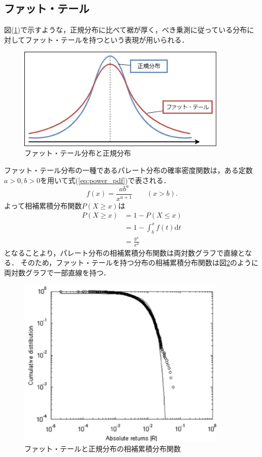 \documentclass[titlepage]{jsreport}
\begin{document}
\subsection{ファット・テール}
図(\ref{fig:fat_tail})で示すような，正規分布に比べて裾が厚く，べき乗測に従っている分布に対してファット・テールを持つという表現が用いられる\cite{fat-tailed}．
\begin{figure}[htbp]
    \centering
    \includegraphics[width=10cm]{fig/fat_tail.png}
    \caption{ファット・テール分布と正規分布}
    \label{fig:fat_tail}
\end{figure}
ファット・テール分布の一種であるパレート分布の確率密度関数は，ある定数$a > 0,b > 0$を用いて式(\ref{eq:power_pdf})で表される\cite{PowerDistribution}．
\begin{equation}
    f(x) = \frac{ab^a}{x^{a + 1}} \qquad (x > b). \label{eq:power_pdf}
\end{equation}
よって相補累積分布関数$P(X \geq x)$は
\begin{equation}
    \begin{aligned}
        P(X \geq x) & = 1 - P(X \leq x)                     \\
                    & = 1 - \int_{b}^{x} f(t) \mathrm{d}t   \\
                    & = \frac{b^a}{x^a} \label{eq:survival}
    \end{aligned}
\end{equation}
となることより，パレート分布の相補累積分布関数は両対数グラフで直線となる．
そのため，ファット・テールを持つ分布の相補累積分布関数は図\ref{fig:fat_tail_survival}のように両対数グラフで一部直線を持つ．

\begin{figure}[htbp]
    \centering
    \includegraphics[width=10cm]{fig/fat_tail_survival.pdf}
    \caption{ファット・テールと正規分布の相補累積分布関数\cite{Cont2007}}
    \label{fig:fat_tail_survival}
\end{figure}
\end{document}
